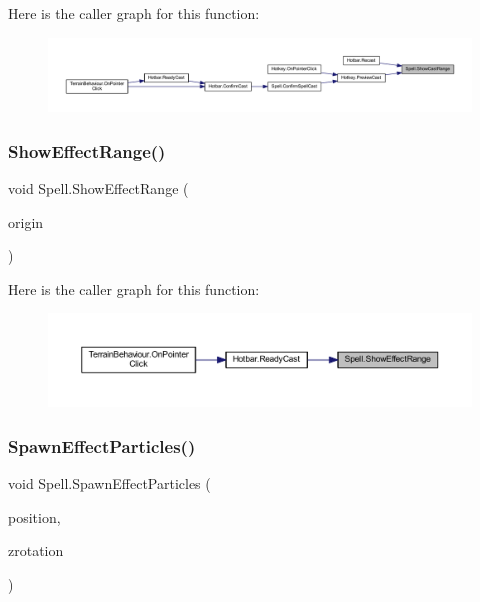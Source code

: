 Here is the caller graph for this function\+:
\nopagebreak
\begin{figure}[H]
\begin{center}
\leavevmode
\includegraphics[width=350pt]{class_spell_ad49f8d3af9c5a885120ca85b510eae75_icgraph}
\end{center}
\end{figure}
\mbox{\label{class_spell_af7f2944573b064a7f561227d6f6fc601}} 
\subsubsection{\texorpdfstring{ShowEffectRange()}{ShowEffectRange()}}
{\footnotesize\ttfamily void Spell.\+Show\+Effect\+Range (\begin{DoxyParamCaption}\item[{Vector2\+Int}]{origin }\end{DoxyParamCaption})}

Here is the caller graph for this function\+:
\nopagebreak
\begin{figure}[H]
\begin{center}
\leavevmode
\includegraphics[width=350pt]{class_spell_af7f2944573b064a7f561227d6f6fc601_icgraph}
\end{center}
\end{figure}
\mbox{\label{class_spell_ac96caa87a4e57a75bd70672a7cd9b83c}} 
\subsubsection{\texorpdfstring{SpawnEffectParticles()}{SpawnEffectParticles()}}
{\footnotesize\ttfamily void Spell.\+Spawn\+Effect\+Particles (\begin{DoxyParamCaption}\item[{Vector2\+Int}]{position,  }\item[{float}]{zrotation }\end{DoxyParamCaption})}

